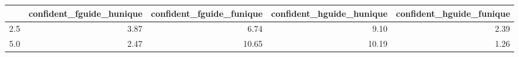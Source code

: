 \begin{tabular}{lrrrr}
\toprule
 & confident_fguide_hunique & confident_fguide_funique & confident_hguide_hunique & confident_hguide_funique \\
\midrule
2.5 & 3.87 & 6.74 & 9.10 & 2.39 \\
5.0 & 2.47 & 10.65 & 10.19 & 1.26 \\
\bottomrule
\end{tabular}
